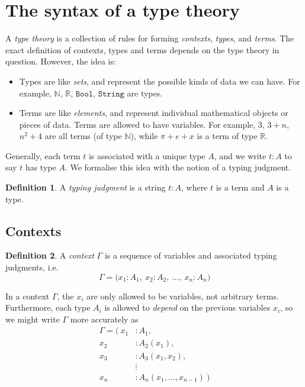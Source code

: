 \documentclass{article}
\theoremstyle{definition}
\newtheorem{definition}{Definition}[section]
\newcommand{\Bool}{\mathtt{Bool}}
\newcommand{\String}{\mathtt{String}}
\newcommand{\N}{\mathbb{N}}		        	    %
\newcommand{\R}{\mathbb{R}}		        	    %
\begin{document}
\section{The syntax of a type theory}
\label{sec:syntax}

A \textit{type theory} is a collection of rules for forming \textit{contexts}, \textit{types}, and \textit{terms}. The exact definition of contexts, types and terms depends on the type theory in question. However, the idea is:
\begin{itemize}
    \item Types are like \textit{sets}, and represent the possible kinds of data we can have. For example, $\N$, $\R$, $\Bool$, $\String$ are types.
    
    \item Terms are like \textit{elements}, and represent individual mathematical objects or pieces of data. Terms are allowed to have variables. For example, $3$, $3 + n$, $n^2 + 4$ are all terms (of type $\N$), while $\pi + e + x$ is a term of type $\R$.
\end{itemize}

Generally, each term $t$ is associated with a unique type $A$, and we write $t : A$ to say $t$ has type $A$. We formalise this idea with the notion of a typing judgment.

\begin{definition}
    A \textit{typing judgment} is a string $t : A$, where $t$ is a term and $A$ is a type.
\end{definition}


\subsection{Contexts}

\begin{definition}
    A \textit{context} $\Gamma$ is a sequence of variables and associated typing judgments, i.e.
    $$\Gamma = \big( x_1 : A_1,\ x_2 : A_2,\ \ldots,\ x_n : A_n \big)$$
\end{definition}

In a context $\Gamma$, the $x_i$ are only allowed to be variables, not arbitrary terms. Furthermore, each type $A_i$ is allowed to \textit{depend} on the previous variables $x_i$, so we might write $\Gamma$ more accurately as
\begin{align*}
    \Gamma = \big(\
    x_1 &: A_1,\\
    x_2 &: A_2(x_1),\\
    x_3 &: A_3(x_1,x_2),\\
    &\mathrel{\vdots}\\
    x_n &: A_n(x_1,\ldots,x_{n-1})\ \big)
\end{align*}
\end{document}
